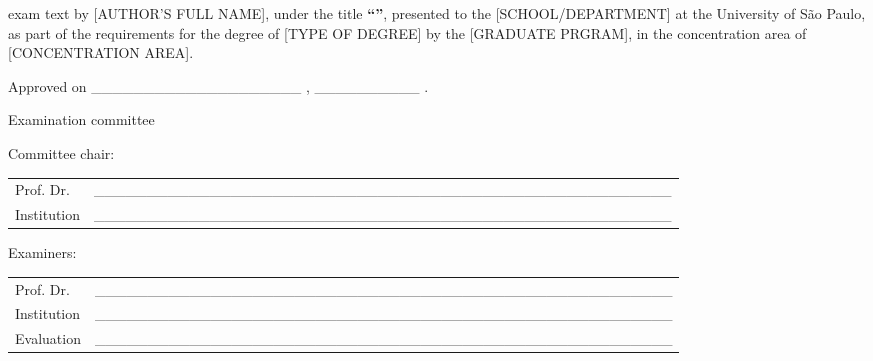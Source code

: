 \documentclass[
  12pt,
  a4paper,
  oneside]{tesesusp}
\begin{document}
\begin{folhadeaprovacao}
 exam text by [AUTHOR'S FULL NAME], under the title \textbf{``\imprimirtitulo''}, presented to the [SCHOOL/DEPARTMENT] at the University of São Paulo, as part of the requirements for the degree of [TYPE OF DEGREE] by the [GRADUATE PRGRAM], in the concentration area of [CONCENTRATION AREA].


\vspace*{1.5cm}

\noindent
Approved on \_\_\_\_\_\_\_\_\_\_\_\_\_\_\_\_\_\_\_\_ , \_\_\_\_\_\_\_\_\_\_ .

\vspace*{1.5cm}

\begin{center}
\noindent Examination committee
\end{center}

\vspace*{0.5cm}

\noindent Committee chair:

\vspace*{0.25cm}

\renewcommand{\arraystretch}{2}
\setlength{\arrayrulewidth}{0pt}
\setlength{\tabcolsep}{0pt}
\noindent
\begin{tabular}{m{2cm} P{14cm}}
  Prof. Dr. & \_\_\_\_\_\_\_\_\_\_\_\_\_\_\_\_\_\_\_\_\_\_\_\_\_\_\_\_\_\_\_\_\_\_\_\_\_\_\_\_\_\_\_\_\_\_\_\_\_\_\_\_\_\_\_ \\
  Institution & \_\_\_\_\_\_\_\_\_\_\_\_\_\_\_\_\_\_\_\_\_\_\_\_\_\_\_\_\_\_\_\_\_\_\_\_\_\_\_\_\_\_\_\_\_\_\_\_\_\_\_\_\_\_\_ \\
\end{tabular}

\vspace*{1cm}

\noindent Examiners:

\vspace*{0.25cm}

\noindent
\begin{tabular}{m{2cm} P{14cm}}
  Prof. Dr. & \_\_\_\_\_\_\_\_\_\_\_\_\_\_\_\_\_\_\_\_\_\_\_\_\_\_\_\_\_\_\_\_\_\_\_\_\_\_\_\_\_\_\_\_\_\_\_\_\_\_\_\_\_\_\_ \\
  Institution & \_\_\_\_\_\_\_\_\_\_\_\_\_\_\_\_\_\_\_\_\_\_\_\_\_\_\_\_\_\_\_\_\_\_\_\_\_\_\_\_\_\_\_\_\_\_\_\_\_\_\_\_\_\_\_ \\
  Evaluation & \_\_\_\_\_\_\_\_\_\_\_\_\_\_\_\_\_\_\_\_\_\_\_\_\_\_\_\_\_\_\_\_\_\_\_\_\_\_\_\_\_\_\_\_\_\_\_\_\_\_\_\_\_\_\_ \\
\end{tabular}


\end{folhadeaprovacao}
\end{document}
